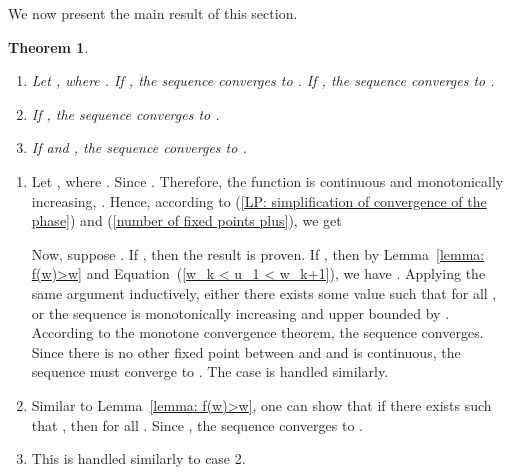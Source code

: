 \documentclass{IEEEtran}
\newtheorem{theorem}{Theorem}
\begin{document}
We now present the main result of this section.
\begin{theorem} \label{thm: convergence of the fixed point}
\leavevmode
\begin{enumerate}
\item Let , where .
If , the sequence  converges to .
If , the sequence  converges to .
\item If ,  the sequence  converges to .
\item If  and ,  the sequence  converges to .

\end{enumerate}
\end{theorem}
\begin{IEEEproof}
\leavevmode
\begin{enumerate}
\item Let , where . Since
. Therefore,
the function  is continuous and monotonically increasing,
. Hence, according to (\ref{LP: simplification of convergence of the phase}) and (\ref{number of fixed
points plus}), we get




Now, suppose \mbox{}.
If , then the result is proven.
If , then by Lemma~\ref{lemma: f(w)>w} and  Equation~(\ref{w_k < u_1 < w_k+1}), we have . Applying the
same argument inductively, either there exists some value  such that  for all , or the sequence
 is monotonically increasing and upper bounded by . According to the monotone convergence theorem, the
sequence converges. Since there is no other fixed point between  and  and  is continuous, the sequence
 must converge to . The case  is handled similarly.

\item Similar to Lemma~\ref{lemma: f(w)>w}, one can show that if there exists  such that  , then  for all
    .  Since , the sequence  converges to .

\item This is handled similarly to case 2.
\end{enumerate}
\end{IEEEproof}
\end{document}
